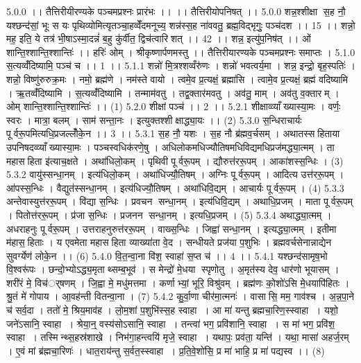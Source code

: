 5.0.0
।। तैत्तिरीयीरण्यके पञ्चमप्रश्नः प्रारंभः ।। ।। तैत्तिरीयोपनिषत् ।।
5.0.0
शन्न॒श्शीक्षा स॒ह नौ॒ यश्छन्द॑सां॒ भूः स यः पृथिव्योमित्यृतञ्चा॒हव्वेँदमनूच्य॒ शन्न॑स्स॒ह ना॑ववतु॒ ब्रह्म॒विद्भृगुः॒ पञ्च॑दश ।। 15 ।। शन्नो॒ मह॒ इति॒ ये तत्र॑ भी॒षाऽस्मा॒दन्नं॑ ब॒हु कु॑र्वीत॒ द्विच॑त्वारिशत् ।। 42 ।। शन्न॒ इत्यु॑प॒निष॑त् ।। ओं शान्ति॒श्शान्ति॒श्शान्तिः॑ ।। हरिः॑ ओम् । श्रीकृष्णार्पणमस्तु ।। तैत्तिरीयारण्यके पञ्चमप्रश्नः समाप्तः ।
5.1.0
स॒त्यव्वँ॑दिष्यामि॒ पञ्च॑ च ।। 1 ।।
5.1.1
शन्नो॑ मि॒त्रश्शव्वँरु॑णः । शन्नो॑ भवत्वर्य॒मा । शन्न॒ इन्द्रो॒ बृह॒स्पतिः॑ । शन्नो॒ विष्णु॑रुरुक्र॒मः । नमो॒ ब्रह्म॑णे । नम॑स्ते वायो । त्वमे॒व प्र॒त्यक्षं॒ ब्रह्मा॑सि । त्वामे॒व प्र॒त्यक्षं॒ ब्रह्म॑ वदिष्यामि । ऋ॒तव्वँ॑दिष्यामि । स॒त्यव्वँ॑दिष्यामि । तन्माम॑वतु । तद्व॒क्तार॑मवतु । अव॑तु॒ माम् । अव॑तु व॒क्तारम् । ओम् शान्ति॒श्शान्ति॒श्शान्तिः॑ ।। (1)
5.2.0
शीक्षां पञ्च॑ ।। 2 ।।
5.2.1
शीक्षाव्व्याँख्यास्या॒मः । वर्णः॒ स्वरः । मात्रा॒ बलम् । साम॑ सन्ता॒नः । इत्युक्तश्शीक्षाद्ध्या॒यः ।। (2)
5.3.0
स॒न्धिराचार्यः पूर्वरू॒पमित्यधि॒प्रजल्लोँ॑के॒न ।। 3 ।।
5.3.1
स॒ह नौ॒ यशः । स॒ह नौ ब्र॑ह्मव॒र्चसम् । अथातस्सहिताया उपनिषदव्व्याँख्यास्या॒मः । पञ्चस्वधिक॑रणे॒षु । अधिलोकमधिज्यौतिषमधिविद्यमधिप्रज॑मद्ध्या॒त्मम् । ता महासहिता इ॑त्याच॒क्षते । अथा॑धिलो॒कम् । पृथिवी पूर्वरू॒पम् । द्यौरुत्त॑ररू॒पम् । आका॑शस्स॒न्धिः । (3)
5.3.2
वायु॑स्सन्धा॒नम् । इत्य॑धिलो॒कम् । अथा॑धिज्यौ॒तिषम् । अग्निः पूर्वरू॒पम् । आदित्य उत्त॑ररू॒पम् । आ॑पस्स॒न्धिः । वैद्युत॑स्सन्धा॒नम् । इत्य॑धिज्यौ॒तिषम् । अथा॑धिवि॒द्यम् । आचार्यः पूर्वरू॒पम् । (4)
5.3.3
अन्तेवास्युत्त॑ररू॒पम् । वि॑द्या स॒न्धिः । प्रवचन॑ सन्धा॒नम् । इत्य॑धिवि॒द्यम् । अथाधि॒प्रजम् । माता पूर्वरू॒पम् । पितोत्त॑ररू॒पम् । प्र॑जा स॒न्धिः । प्रजनन॑ सन्धा॒नम् । इत्यधि॒प्रजम् । (5)
5.3.4
अथाद्ध्या॒त्मम् । अधराहनुः पूर्वरू॒पम् । उत्तराहनुरुत्त॑ररू॒पम् । वाख्स॒न्धिः । जिह्वा॑ सन्धा॒नम् । इत्यद्ध्या॒त्मम् । इतीमा म॑हास॒॒हिताः । य एवमेता महासहिता व्याख्या॑ता वे॒द । सन्धीयते प्रज॑या प॒शुभिः । ब्रह्मवर्चसेनान्नाद्येन सुवर्ग्येण॑ लोके॒न ।। (6)
5.4.0
वि॒त॒न्वा॒ना वि॑श॒ स्वाहा॑ स॒प्त च॑ ।। 4 ।।
5.4.1
यश्छन्द॑सामृष॒भो वि॒श्वरू॑पः । छन्दो॒भ्योऽद्ध्य॒मृताथ्सम्ब॒भूव॑ । स मेन्द्रो॑ मे॒धया स्पृणोतु । अ॒मृत॑स्य देव॒ धार॑णो भूयासम् । शरी॑रं मे॒ विच॑र््षणम् । जि॒ह्वा मे॒ मधु॑मत्तमा । कर्णाभ्यां॒ भूरि॒ विश्रु॑वम् । ब्रह्म॑णः को॒शो॑ऽसि मे॒धयापि॑हितः । श्रु॒तं मे॑ गोपाय । आ॒वह॑न्ती वितन्वा॒ना । (7)
5.4.2
कु॒र्वा॒णा चीर॑मा॒त्मनः॑ । वासा॑सि॒ मम॒ गाव॑श्च । अ॒न्न॒पा॒ने च॑ सर्व॒दा । ततो॑ मे॒ श्रिय॒माव॑ह । लो॒म॒शां प॒शुभि॑स्स॒ह स्वाहा । आ मा॑ यन्तु ब्रह्मचा॒रिण॒स्स्वाहा । यशो॒ जने॑ऽसानि॒ स्वाहा । श्रेया॒न्॒ वस्य॑सोऽसानि॒ स्वाहा । तन्त्वा॑ भग॒ प्रवि॑शानि॒ स्वाहा । स मा॑ भग॒ प्रवि॑श॒ स्वाहा । तस्मिन्थ्स॒हस्र॑शाखे । निभ॑गा॒हन्त्वयि॑ मृजे॒ स्वाहा । यथापः॒ प्रव॑ता॒ यन्ति॑ । यथा॒ मासा॑ अहर्ज॒रम् । ए॒वं मां ब्र॑ह्मचा॒रिणः॑ । धात॒राय॑न्तु स॒र्वत॒स्स्वाहा । प्र॒ति॒वे॒शो॑सि॒ प्र मा॑ भाहि॒ प्र मा॑ पद्यस्व ।। (8)
